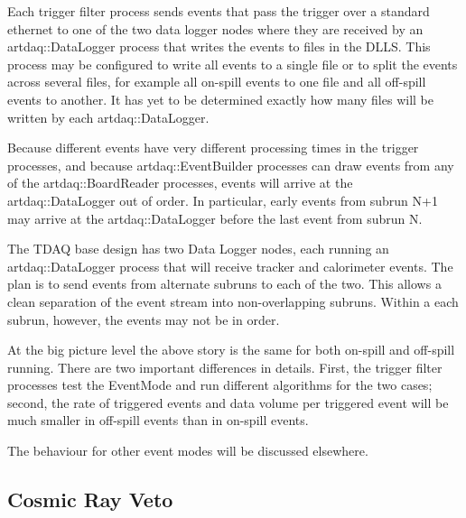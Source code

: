 
Each \art trigger filter process sends events that pass the trigger over a standard ethernet
to one of the two data logger nodes where they are received by an {\code artdaq::DataLogger} process
that writes the events to files in the DLLS.
This process may be configured to write all events to a single file
or to split the events across several files,
for example all on-spill events to one file and all off-spill events to another.
It has yet to be determined exactly how many files will be written
by each {\code artdaq::DataLogger}.

Because different events have very different processing times in the trigger processes,
and because {\code artdaq::EventBuilder} processes can draw events from
any of the {\code artdaq::BoardReader} processes, events will arrive at the
{\code artdaq::DataLogger} out of order.  In particular, early events from subrun N+1
may arrive at the {\code artdaq::DataLogger} before the last event from subrun N.

The TDAQ base design has two Data Logger nodes, each running an
{\code artdaq::DataLogger} process that will receive tracker and calorimeter events.
The plan is to send events from alternate subruns to each of the two.
This allows a clean separation of the event stream into non-overlapping subruns.
Within a each subrun, however, the events may not be in order.


At the big picture level the above story is the same for both on-spill and off-spill running.
There are two important differences in details.
First, the trigger filter processes test the EventMode
and run different algorithms for the two cases;
second, the rate of triggered events
and data volume per triggered event will be much smaller in off-spill events than in on-spill events.


The behaviour for other event modes will be discussed elsewhere.

\subsection{Cosmic Ray Veto}
\label{ssec:CRV}

